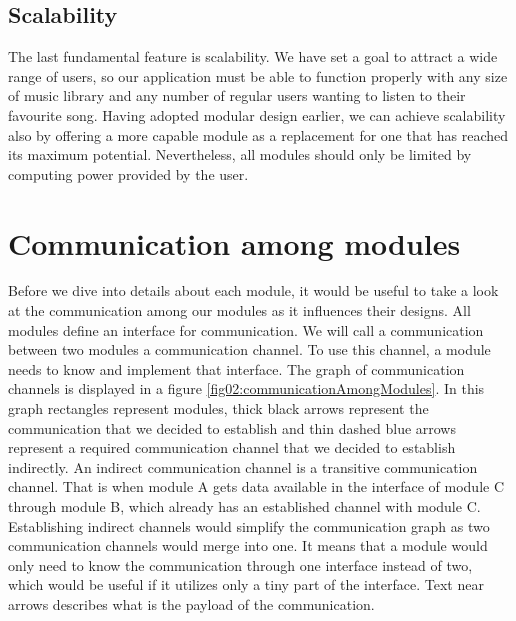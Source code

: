 \subsection{Scalability}

The last fundamental feature is scalability. We have set a goal to attract a wide range of users, so our application must be able to function properly with any size of music library and any number of regular users wanting to listen to their favourite song. Having adopted modular design earlier, we can achieve scalability also by offering a more capable module as a replacement for one that has reached its maximum potential. Nevertheless, all modules should only be limited by computing power provided by the user.

\section{Communication among modules}

Before we dive into details about each module, it would be useful to take a look at the communication among our modules as it influences their designs. All modules define an interface for communication. We will call a communication between two modules a communication channel. To use this channel, a module needs to know and implement that interface. The graph of communication channels is displayed in a figure \ref{fig02:communicationAmongModules}. In this graph rectangles represent modules, thick black arrows represent the communication that we decided to establish and thin dashed blue arrows represent a required communication channel that we decided to establish indirectly. An indirect communication channel is a transitive communication channel. That is when module A gets data available in the interface of module C through module B, which already has an established channel with module C. Establishing indirect channels would simplify the communication graph as two communication channels would merge into one. It means that a module would only need to know the communication through one interface instead of two, which would be useful if it utilizes only a tiny part of the interface. Text near arrows describes what is the payload of the communication. 

